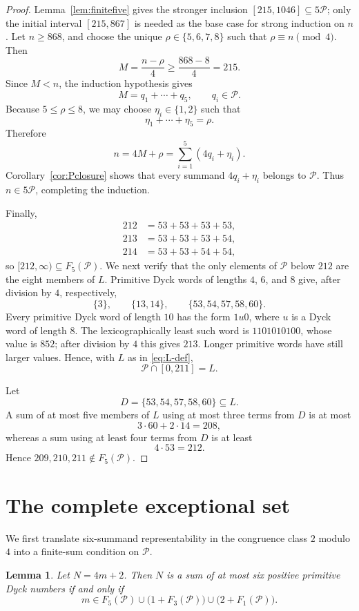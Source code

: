 \documentclass[12pt]{article}
\theoremstyle{plain}
\newtheorem{lemma}[theorem]{Lemma}
\theoremstyle{definition}
\theoremstyle{plain}
\newcommand{\Pset}{\mathcal{P}}
\begin{document}
\begin{proof}
Lemma~\ref{lem:finitefive} gives the stronger inclusion
$[215,1046]\subseteq5\Pset$; only the initial interval $[215,867]$ is
needed as the base case for strong induction on $n$.  Let $n\geq868$, and
choose the unique $\rho\in\{5,6,7,8\}$ such that
$\rho\equiv n\pmod4$.  Then
\[
 M=\frac{n-\rho}{4}\geq\frac{868-8}{4}=215.
\]
Since $M<n$, the induction hypothesis gives
\[
 M=q_1+\cdots+q_5,\qquad q_i\in\Pset.
\]
Because $5\leq\rho\leq8$, we may choose $\eta_i\in\{1,2\}$ such that
\[
 \eta_1+\cdots+\eta_5=\rho.
\]
Therefore
\[
 n=4M+\rho=\sum_{i=1}^{5}(4q_i+\eta_i).
\]
Corollary~\ref{cor:Pclosure} shows that every summand $4q_i+\eta_i$ belongs
to $\Pset$.  Thus $n\in5\Pset$, completing the induction.

Finally,
\[
\begin{aligned}
212&=53+53+53+53,\\
213&=53+53+53+54,\\
214&=53+53+54+54,
\end{aligned}
\]
so $[212,\infty)\subseteq F_5(\Pset)$.  We next verify that the only elements of $\Pset$ below $212$ are the
eight members of $L$.  Primitive Dyck words of lengths $4$, $6$, and $8$
give, after division by $4$, respectively,
\[
 \{3\},\qquad \{13,14\},\qquad \{53,54,57,58,60\}.
\]
Every primitive Dyck word of length $10$ has the form $1u0$, where $u$
is a Dyck word of length $8$.  The lexicographically least such word is
$1101010100$, whose value is $852$; after division by $4$ this gives
$213$.  Longer primitive words have still larger values.  Hence, with $L$ as
in \eqref{eq:L-def},
\[
 \Pset\cap[0,211]=L.
\]

Let
\[
 D=\{53,54,57,58,60\}\subseteq L.
\]
A sum of at most five members of $L$ using at most three terms from $D$
is at most
\[
 3\cdot60+2\cdot14=208,
\]
whereas a sum using at least four terms from $D$ is at least
\[
 4\cdot53=212.
\]
Hence $209,210,211\notin F_5(\Pset)$.
\end{proof}

\section{The complete exceptional set}\label{sec:exceptions}

We first translate six-summand representability in the congruence class
$2$ modulo $4$ into a finite-sum condition on $\Pset$.

\begin{lemma}\label{lem:sixcriterion}
Let $N=4m+2$.  Then $N$ is a sum of at most six positive primitive Dyck
numbers if and only if
\[
 m\in F_5(\Pset)
 \cup\bigl(1+F_3(\Pset)\bigr)
 \cup\bigl(2+F_1(\Pset)\bigr).
\]
\end{lemma}
\end{document}
